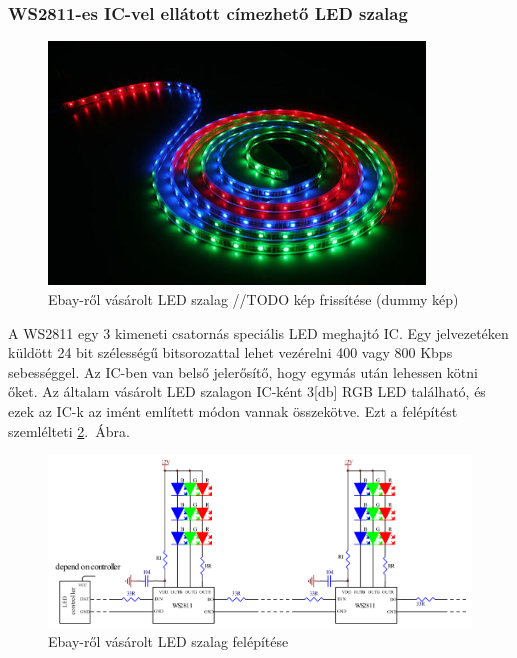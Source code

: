 \documentclass[../main.tex]{subfiles}
\begin{document}
        \subsubsection{WS2811-es IC-vel ellátott címezhető LED szalag}
            
            \begin{figure}[h!]
                \centering
                \includegraphics[width=10cm]{resources/pcb_res/ledstrip.jpg}
                \caption{Ebay-ről vásárolt LED szalag //TODO kép frissítése (dummy kép)}
                \label{fig:ledstrip}
            \end{figure}
        
            A WS2811 egy 3 kimeneti csatornás speciális LED meghajtó IC. Egy jelvezetéken küldött 24 bit szélességű bitsorozattal lehet vezérelni 400 vagy 800 Kbps sebességgel. Az IC-ben van belső jelerősítő, hogy egymás után lehessen kötni őket. Az általam vásárolt LED szalagon IC-ként 3[db] RGB LED található, és ezek az IC-k az imént említett módon vannak összekötve. Ezt a felépítést szemlélteti \ref{fig:ledstrip_schematic}.~Ábra.\\[12px]
            
            \begin{figure}[h!] %
                \centering
                \includegraphics[width=14cm]{resources/pcb_res/ledstrip_schematic.png}
                \caption{Ebay-ről vásárolt LED szalag felépítése}
                \label{fig:ledstrip_schematic}
            \end{figure}
            
\end{document}
